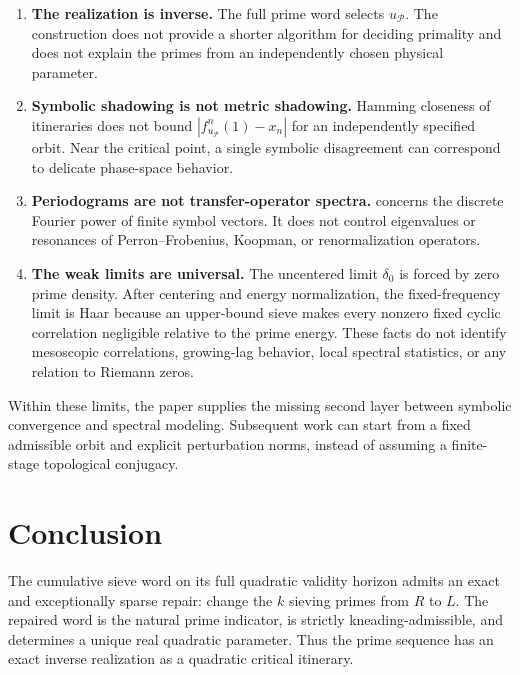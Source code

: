 \documentclass[11pt]{article}
\theoremstyle{definition}
\theoremstyle{remark}
\newcommand{\uP}{u_{\mathcal P}}
\begin{document}
\begin{enumerate}[label=(\arabic*)]
    \item \textbf{The realization is inverse.}  The full prime word selects $\uP$.  The construction does not provide a shorter algorithm for deciding primality and does not explain the primes from an independently chosen physical parameter.

    \item \textbf{Symbolic shadowing is not metric shadowing.}  Hamming closeness of itineraries does not bound $|f_{\uP}^n(1)-x_n|$ for an independently specified orbit.  Near the critical point, a single symbolic disagreement can correspond to delicate phase-space behavior.

    \item \textbf{Periodograms are not transfer-operator spectra.}   concerns the discrete Fourier power of finite symbol vectors.  It does not control eigenvalues or resonances of Perron--Frobenius, Koopman, or renormalization operators.

    \item \textbf{The weak limits are universal.}  The uncentered limit $\delta_0$ is forced by zero prime density.  After centering and energy normalization, the fixed-frequency limit is Haar because an upper-bound sieve makes every nonzero fixed cyclic correlation negligible relative to the prime energy.  These facts do not identify mesoscopic correlations, growing-lag behavior, local spectral statistics, or any relation to Riemann zeros.
\end{enumerate}

Within these limits, the paper supplies the missing second layer between symbolic convergence and spectral modeling.  Subsequent work can start from a fixed admissible orbit and explicit perturbation norms, instead of assuming a finite-stage topological conjugacy.

\section{Conclusion}

The cumulative sieve word on its full quadratic validity horizon admits an exact and exceptionally sparse repair: change the $k$ sieving primes from $R$ to $L$.  The repaired word is the natural prime indicator, is strictly kneading-admissible, and determines a unique real quadratic parameter.  Thus the prime sequence has an exact inverse realization as a quadratic critical itinerary.
\end{document}
